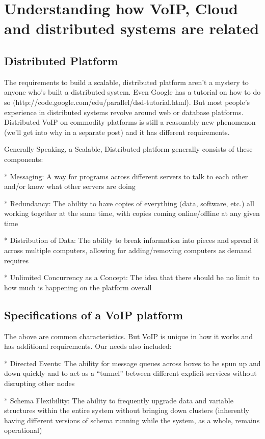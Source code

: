 \chapter{Understanding how VoIP, Cloud and distributed systems are related}
\label{ch:voipcloud}

\section{Distributed Platform}
The requirements to build a scalable, distributed platform aren’t a mystery to anyone who’s built a distributed system. Even Google has a tutorial on how to do so (http://code.google.com/edu/parallel/dsd-tutorial.html). But most people’s experience in distributed systems revolve around web or database platforms. Distributed VoIP on commodity platforms is still a reasonably new phenomenon (we’ll get into why in a separate post) and it has different requirements.

Generally Speaking, a Scalable, Distributed platform generally consists of these components:

* Messaging: A way for programs across different servers to talk to each other and/or know what other servers are doing

* Redundancy: The ability to have copies of everything (data, software, etc.) all working together at the same time, with copies coming online/offline at any given time

* Distribution of Data: The ability to break information into pieces and spread it across multiple computers, allowing for adding/removing computers as demand requires

* Unlimited Concurrency as a Concept: The idea that there should be no limit to how much is happening on the platform overall 

\section{Specifications of a VoIP platform}
The above are common characteristics. But VoIP is unique in how it works and has additional requirements. Our needs also included:

* Directed Events: The ability for message queues across boxes to be spun up and down quickly and to act as a “tunnel” between different explicit services without disrupting other nodes

* Schema Flexibility: The ability to frequently upgrade data and variable structures within the entire system without bringing down clusters (inherently having different versions of schema running while the system, as a whole, remains operational)

